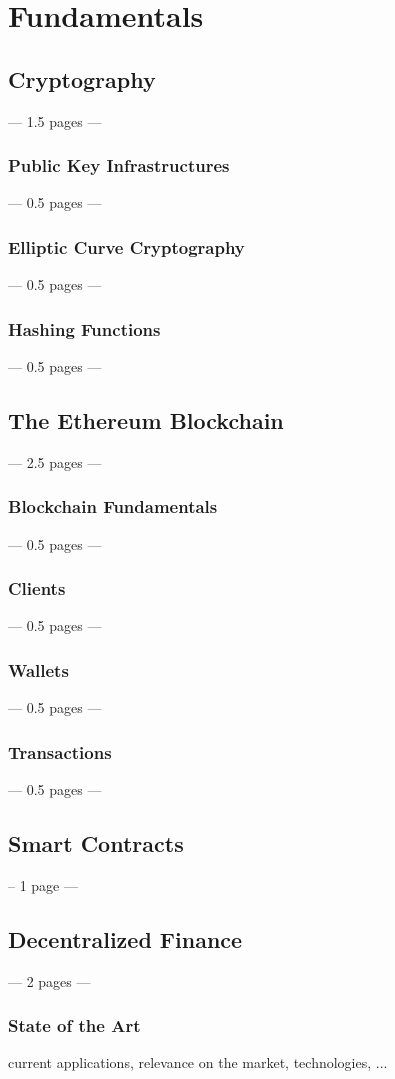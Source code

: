 \chapter{Fundamentals}
\label{cha:Fundamentals}

\section{Cryptography}
--- 1.5 pages ---
\subsection{Public Key Infrastructures}
--- 0.5 pages ---
\subsection{Elliptic Curve Cryptography}
--- 0.5 pages ---
\subsection{Hashing Functions}
--- 0.5 pages ---

\section{The Ethereum Blockchain}
--- 2.5 pages ---
\subsection{Blockchain Fundamentals}
--- 0.5 pages ---
\subsection{Clients}
--- 0.5 pages ---
\subsection{Wallets}
--- 0.5 pages ---
\subsection{Transactions}
--- 0.5 pages ---
\section{Smart Contracts}
-- 1 page ---
\section{Decentralized Finance}
--- 2 pages ---
\subsection{State of the Art}
current applications, relevance on the market, technologies, ...